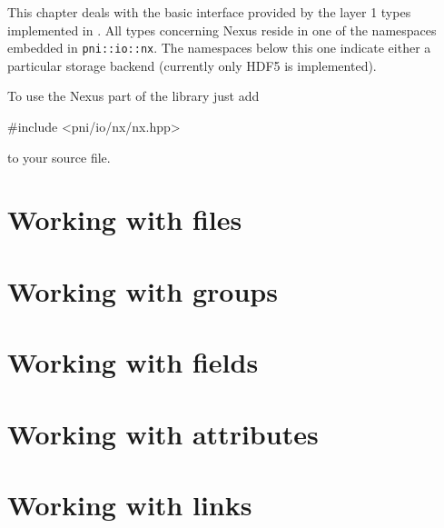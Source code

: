 
This chapter deals with the basic interface provided by the layer 1 types
implemented in \libpniio. All types concerning Nexus reside in one of the
namespaces embedded in \texttt{pni::io::nx}. The namespaces below this one 
indicate either a particular storage backend (currently only HDF5 is
implemented).

To use the Nexus part of the library just add 
\begin{cppcode}
#include <pni/io/nx/nx.hpp>
\end{cppcode}
to your source file. 

\section{Working with files}



\section{Working with groups}



\section{Working with fields}



\section{Working with attributes}


\section{Working with links}




